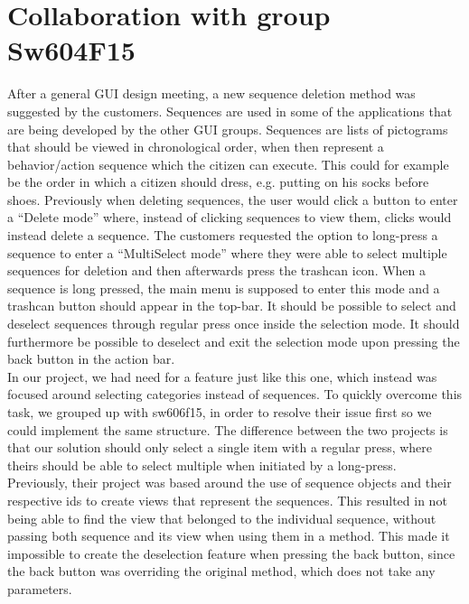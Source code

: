 \section{Collaboration with group Sw604F15}
\label{sec:collaboration_with_group_sw604f15}

After a general GUI design meeting, a new sequence deletion method was suggested by the customers. Sequences are used in some of the applications that are being developed by the other GUI groups. Sequences are lists of pictograms that should be viewed in chronological order, when then represent a behavior/action sequence which the citizen can execute. This could for example be the order in which a citizen should dress, e.g. putting on his socks before shoes. Previously when deleting sequences, the user would click a button to enter a ``Delete mode'' where, instead of clicking sequences to view them, clicks would instead delete a sequence. The customers requested the option to long-press a sequence to enter a ``MultiSelect mode'' where they were able to select multiple sequences for deletion and then afterwards press the trashcan icon. When a sequence is long pressed, the main menu is supposed to enter this mode and a trashcan button should appear in the top-bar. It should be possible to select and deselect sequences through regular press once inside the selection mode. It should furthermore be possible to deselect and exit the selection mode upon pressing the back button in the action bar.\\

In our project, we had need for a feature just like this one, which instead was focused around selecting categories instead of sequences. To quickly overcome this task, we grouped up with sw606f15, in order to resolve their issue first so we could implement the same structure. The difference between the two projects is that our solution should only select a single item with a regular press, where theirs should be able to select multiple when initiated by a long-press. \\
 
Previously, their project was based around the use of sequence objects and their respective ids to create views that represent the sequences. This resulted in not being able to find the view that belonged to the individual sequence, without passing both sequence and its view when using them in a method. This made it impossible to create the deselection feature when pressing the back button, since the back button was overriding the original  method, which does not take any parameters. \\
 
